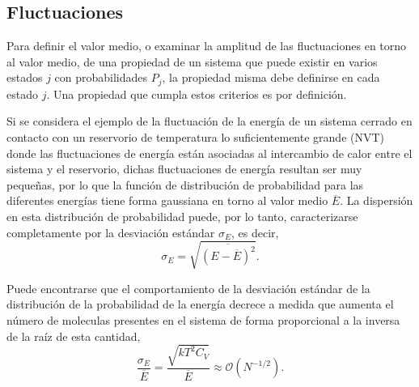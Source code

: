 \subsection{Fluctuaciones}

Para definir el valor medio, o examinar la amplitud de las fluctuaciones en torno 
al valor medio, de una propiedad de un sistema que puede existir en varios estados
$j$ con probabilidades $P_j$, la propiedad misma debe definirse en cada estado 
$j$. Una propiedad que cumpla estos criterios es  por definición.

Si se considera el ejemplo de la fluctuación de la energía de un sistema cerrado 
en  contacto con un reservorio de temperatura lo suficientemente grande (NVT) 
donde las fluctuaciones de energía están asociadas al intercambio de calor entre 
el sistema y el reservorio, dichas fluctuaciones de energía resultan ser muy 
pequeñas, por lo que la función de distribución de probabilidad para las 
diferentes energías tiene forma gaussiana en torno al valor medio $\overline{E}$. 
La dispersión en esta distribución de probabilidad puede, por lo tanto,
caracterizarse completamente por la desviación estándar $\sigma_E$, es decir, 
\begin{equation*}
\sigma_E = \sqrt{\overline{(E - \overline{E})^2}}.
\end{equation*}


Puede encontrarse que el comportamiento de la desviación estándar de la 
distribución de la probabilidad de la energía decrece a medida que aumenta el 
número de moleculas presentes en el sistema de forma proporcional a la inversa
de la raíz de esta cantidad,
\begin{equation}\label{eq:fluctuaciones}
    \frac{\sigma_E}{\overline{E}} = \frac{\sqrt{kT^2C_V}}{\overline{E}} \approx \mathcal{O}(N^{-1/2}).
\end{equation}

